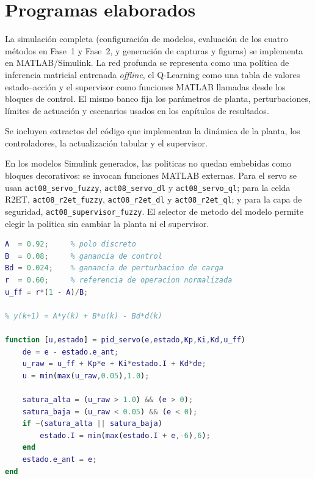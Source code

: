 \chapter{Programas elaborados}
\label{ap:codigo}

La simulación completa (configuración de modelos, evaluación de los cuatro métodos en Fase~1 y Fase~2, y generación de capturas y figuras) se implementa en MATLAB/Simulink. La red profunda se representa como una política de inferencia matricial entrenada \emph{offline}, el Q-Learning como una tabla de valores estado--acción y el supervisor como funciones MATLAB llamadas desde los bloques de control. El mismo banco fija los parámetros de planta, perturbaciones, límites de actuación y escenarios usados en los capítulos de resultados.

Se incluyen extractos del código que implementan la dinámica de la planta, los controladores, la actualización tabular y el supervisor.

En los modelos Simulink generados, las politicas no quedan embebidas como bloques decorativos: se invocan funciones MATLAB externas. Para el servo se usan \texttt{act08\_servo\_fuzzy}, \texttt{act08\_servo\_dl} y \texttt{act08\_servo\_ql}; para la celda R2ET, \texttt{act08\_r2et\_fuzzy}, \texttt{act08\_r2et\_dl} y \texttt{act08\_r2et\_ql}; y para la capa de seguridad, \texttt{act08\_supervisor\_fuzzy}. El selector de metodo del modelo permite elegir la politica sin cambiar la planta ni el supervisor.


\begin{lstlisting}[language=Matlab, caption={Modelo servo reducido del Grupo~1 y controlador PID con anti-windup.}]
% Modelo reducido de primer orden (ZOH, Ts = tau/12) - ecuacion 2.3
A  = 0.92;     % polo discreto
B  = 0.08;     % ganancia de control
Bd = 0.024;    % ganancia de perturbacion de carga
r  = 0.60;     % referencia de operacion normalizada
u_ff = r*(1 - A)/B;

% y(k+1) = A*y(k) + B*u(k) - Bd*d(k)

function [u,estado] = pid_servo(e,estado,Kp,Ki,Kd,u_ff)
    de = e - estado.e_ant;
    u_raw = u_ff + Kp*e + Ki*estado.I + Kd*de;
    u = min(max(u_raw,0.05),1.0);

    satura_alta = (u_raw > 1.0) && (e > 0);
    satura_baja = (u_raw < 0.05) && (e < 0);
    if ~(satura_alta || satura_baja)
        estado.I = min(max(estado.I + e,-6),6);
    end
    estado.e_ant = e;
end
\end{lstlisting}


